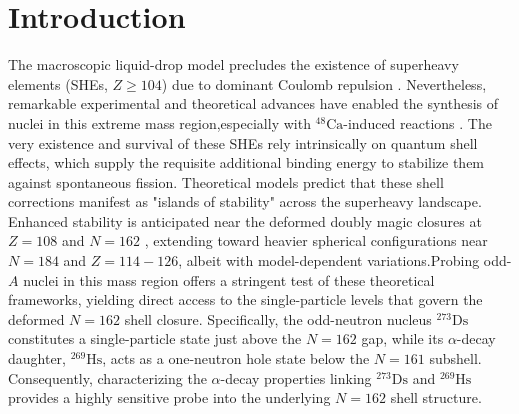 \documentclass[final,5p,times,twocolumn,number,sort&compress]{elsarticle}
\begin{document}



\section{Introduction}
\label{introduction}

The macroscopic liquid-drop model precludes the existence of superheavy elements (SHEs, $Z \ge 104$) due to dominant Coulomb repulsion . 
Nevertheless, remarkable experimental and theoretical advances have enabled the synthesis of nuclei in this extreme mass region,especially with $^{48}\mathrm{Ca}$-induced reactions  \cite{oganessianSuperheavyNuclei48Cainduced2015, oganessianInvestigationCa482022}. 
The very existence and survival of these SHEs rely intrinsically on quantum shell effects, which supply the requisite additional binding energy to stabilize them against spontaneous fission.
Theoretical models predict that these shell corrections manifest as "islands of stability" across the superheavy landscape. 
Enhanced stability is anticipated near the deformed doubly magic closures at $Z  = 108$ and $N = 162$ \cite{dvorakDoublyMagicNucleus2006}, extending toward heavier spherical configurations
near $N = 184$ and $Z = 114-126$, albeit with model-dependent variations\cite{kruppa2000ShellCorrectionsSuperheavy}.Probing odd-$A$ nuclei in this mass region offers a stringent test of these theoretical frameworks,
yielding direct access to the single-particle levels that govern the deformed $N = 162$ shell closure. 
Specifically, the odd-neutron nucleus $^{273}\mathrm{Ds}$ constitutes a single-particle state just above the $N=162$ gap, while its $\alpha$-decay daughter, $^{269}\mathrm{Hs}$, 
acts as a one-neutron hole state below the $N=161$ subshell. Consequently, characterizing the $\alpha$-decay properties linking $^{273}\mathrm{Ds}$ and $^{269}\mathrm{Hs}$ provides a highly sensitive probe into the underlying $N=162$ shell structure. 
\end{document}
